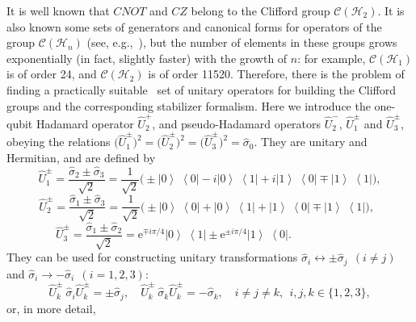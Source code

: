 \documentclass[12pt,a4paper,twoside]{article}      %
\newcommand{\ketbra}[2]{{\ensuremath {\left|#1\right\rangle\!\;\!\!\left\langle#2\right|}}}
\begin{document}
\noindent
It is well known that $CNOT$ and $CZ$ belong to the Clifford group $\mathcal{C}(\mathcal{H}_2)$. It is also known some sets of generators and canonical forms for operators of the group $\mathcal{C}(\mathcal{H}_n)$ (see, e.g.,~\cite{Bravyi2020}), but the number of elements in these groups grows exponentially (in fact, slightly faster) with the growth of $n$: for example, $\mathcal{C}(\mathcal{H}_1)$ is of order 24, and $\mathcal{C}(\mathcal{H}_2)$ is of order 11520. Therefore, there is the problem of finding a practically suitable~\cite{Shende2004} set of unitary operators for building the Clifford groups and the corresponding stabilizer formalism. Here we introduce the one-qubit Hadamard operator $\hat{U}_{2}^+$, and pseudo-Hadamard operators $\hat{U}_{2}^-$, $\hat{U}_{1}^\pm$ and $\hat{U}_{3}^\pm$, obeying the relations $\big(\hat{U}_{1}^\pm\big)^2= \big(\hat{U}_{2}^\pm\big)^2= \big(\hat{U}_{3}^\pm\big)^2= \hat{\sigma}_{0}$. They are unitary and Hermitian, and are defined by
\begin{equation}\label{}
\hat{U}_1^\pm= \frac{\hat{\sigma}_{2}\pm\hat{\sigma}_{3}}{\sqrt{2}}=
\frac{1}{\sqrt{2}}\big(\pm\ketbra{0}{0}- i\ketbra{0}{1}+ i\ketbra{1}{0}\mp \ketbra{1}{1}\big),
\nonumber
\end{equation}
\begin{equation}\label{Had}
\hat{U}_2^\pm= \frac{\hat{\sigma}_{1}\pm\hat{\sigma}_{3}}{\sqrt{2}}=
\frac{1}{\sqrt{2}}\big(\pm\ketbra{0}{0}+ \ketbra{0}{1}+ \ketbra{1}{0}\mp \ketbra{1}{1}\big),\;\;
\end{equation}
\begin{equation}\label{}
\hat{U}_3^\pm= \frac{\hat{\sigma}_{1}\pm\hat{\sigma}_{2}}{\sqrt{2}}=
\mathrm{e}^{\mp{}i\pi/4}\ketbra{0}{1}\pm \mathrm{e}^{\pm{}i\pi/4}\ketbra{1}{0}. \qquad\qquad\qquad\;\,
\nonumber
\end{equation}
They can be used for constructing unitary transformations $\hat{\sigma}_{i}\leftrightarrow\pm\hat{\sigma}_{j}\;\, (i\neq{}j)$ and $\hat{\sigma}_{i}\rightarrow-\hat{\sigma}_{i}\;\, (i=1,2,3)$:
\begin{equation}\label{}
\hat{U}_k^\pm\:\!\hat{\sigma}_{i}\hat{U}_k^\pm= \pm\hat{\sigma}_{j},\quad \hat{U}_k^\pm\:\!\hat{\sigma}_{k}\hat{U}_k^\pm= -\hat{\sigma}_{k},\quad i\neq{j}\neq{k},\;\, i,j,k\in\{1,2,3\},
\nonumber
\end{equation}
or, in more detail,
\end{document}
